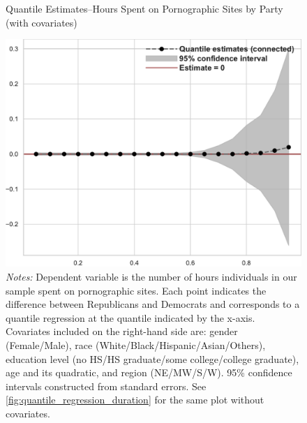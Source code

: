 \documentclass[12pt, letterpaper]{article}
\begin{document}
\begin{figure}[ht]
	\centering
	\caption{Quantile Estimates--Hours Spent on Pornographic Sites by Party (with covariates)}
	\includegraphics[width=.55\linewidth]{../figs/quantile_reg_covariates_duration_adult.pdf}
	\caption*{\footnotesize \emph{Notes:} 
		Dependent variable is the number of hours individuals in our sample spent on pornographic sites.
		Each point indicates the difference between Republicans and Democrats and corresponds to a quantile regression at the quantile indicated by the x-axis.
		Covariates included on the right-hand side are: gender (Female/Male), race (White/Black/Hispanic/Asian/Others), education level (no HS/HS graduate/some college/college graduate), age and its quadratic, and region (NE/MW/S/W).
		95\% confidence intervals constructed from standard errors.
		See \cref{fig:quantile_regression_duration} for the same plot without covariates.
	}
	\label{fig:quantile_regression_duration_covariates}
\end{figure}
\end{document}
